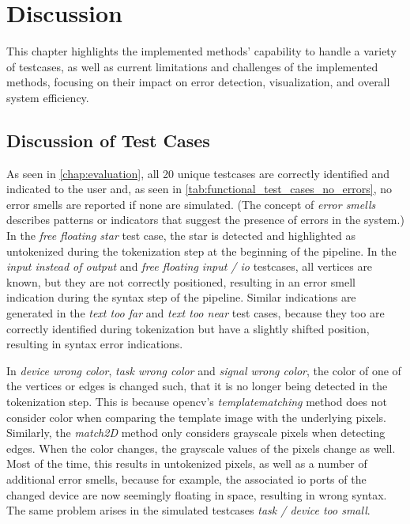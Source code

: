 \chapter{Discussion}
\label{chap:discussion}
This chapter highlights the implemented methods' capability to handle a variety of testcases, as well as current limitations and challenges of the implemented methods, focusing on their impact on error detection, visualization, and overall system efficiency.

\section{Discussion of Test Cases}
As seen in \autoref{chap:evaluation}, all 20 unique testcases are correctly identified and indicated to the user and, as seen in \autoref{tab:functional_test_cases_no_errors}, no error smells are reported if none are simulated. (The concept of \textit{error smells} describes patterns or indicators that suggest the presence of errors in the system.)\\
In the \textit{free floating star} test case, the star is detected and highlighted as untokenized during the tokenization step at the beginning of the pipeline. In the \textit{input instead of output} and \textit{free floating input / \acrshort{io}} testcases, all vertices are known, but they are not correctly positioned, resulting in an error smell indication during the syntax step of the pipeline. Similar indications are generated in the \textit{text too far} and \textit{text too near} test cases, because they too are correctly identified during tokenization but have a slightly shifted position, resulting in syntax error indications.

In \textit{device wrong color}, \textit{task wrong color} and \textit{signal wrong color}, the color of one of the vertices or edges is changed such, that it is no longer being detected in the tokenization step. This is because \acrshort{opencv}'s \textit{templatematching} method does not consider color when comparing the template image with the underlying pixels. Similarly, the \textit{match2D} method only considers grayscale pixels when detecting edges. When the color changes, the grayscale values of the pixels change as well. Most of the time, this results in untokenized pixels, as well as a number of additional error smells, because for example, the associated \acrshort{io} ports of the changed device are now seemingly floating in space, resulting in wrong syntax. The same problem arises in the simulated testcases \textit{task / device too small}.

